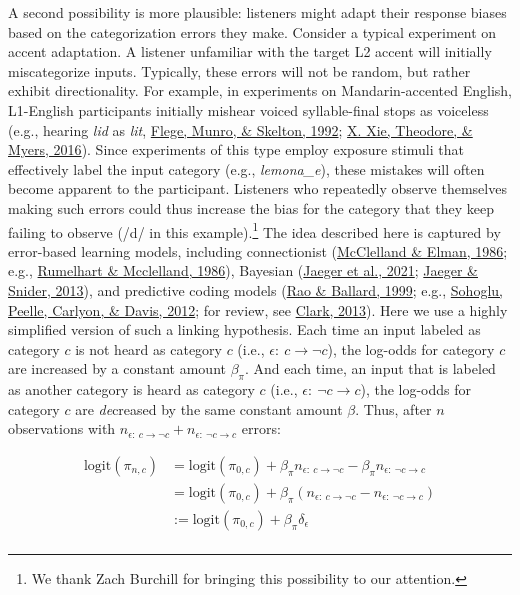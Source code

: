 \documentclass[
  11pt,
  english,
  man,floatsintext]{apa6}
\begin{document}
A second possibility is more plausible: listeners might adapt their response biases based on the categorization errors they make. Consider a typical experiment on accent adaptation. A listener unfamiliar with the target L2 accent will initially miscategorize inputs. Typically, these errors will not be random, but rather exhibit directionality. For example, in experiments on Mandarin-accented English, L1-English participants initially mishear voiced syllable-final stops as voiceless (e.g., hearing \emph{lid} as \emph{lit}, \protect\hyperlink{ref-flege1992}{Flege, Munro, \& Skelton, 1992}; \protect\hyperlink{ref-xie2016jep}{X. Xie, Theodore, \& Myers, 2016}). Since experiments of this type employ exposure stimuli that effectively label the input category (e.g., \emph{lemona\_e}), these mistakes will often become apparent to the participant. Listeners who repeatedly observe themselves making such errors could thus increase the bias for the category that they keep failing to observe (/d/ in this example).\footnote{We thank Zach Burchill for bringing this possibility to our attention.} The idea described here is captured by error-based learning models, including connectionist (\protect\hyperlink{ref-mcclelland-elman1986}{McClelland \& Elman, 1986}; e.g., \protect\hyperlink{ref-rumelhart-mcclelland1986}{Rumelhart \& Mcclelland, 1986}), Bayesian (\protect\hyperlink{ref-jaeger2019}{Jaeger et al., 2021}; \protect\hyperlink{ref-jaeger-snider2013}{Jaeger \& Snider, 2013}), and predictive coding models (\protect\hyperlink{ref-rao-ballard1999}{Rao \& Ballard, 1999}; e.g., \protect\hyperlink{ref-sohoglu2012}{Sohoglu, Peelle, Carlyon, \& Davis, 2012}; for review, see \protect\hyperlink{ref-clark2013}{Clark, 2013}). Here we use a highly simplified version of such a linking hypothesis. Each time an input labeled as category \(c\) is not heard as category \(c\) (i.e., \(\epsilon\mathrm{:}\ c \rightarrow \neg c\)), the log-odds for category \(c\) are increased by a constant amount \(\beta_{\pi}\). And each time, an input that is labeled as another category is heard as category \(c\) (i.e., \(\epsilon\mathrm{:}\ \neg c \rightarrow c\)), the log-odds for category \(c\) are \emph{de}creased by the same constant amount \(\beta\). Thus, after \(n\) observations with \(n_{\epsilon\mathrm{:}\ c \rightarrow \neg c} + n_{\epsilon\mathrm{:}\ \neg c \rightarrow c}\) errors:

\begin{equation}\label{eq:bias-updating}
\begin{split}
\mathrm{logit}(\pi_{n,c}) & = \mathrm{logit}(\pi_{0,c}) + \beta_{\pi} n_{\epsilon\mathrm{:}\ c \rightarrow \neg c} - \beta_{\pi} n_{\epsilon\mathrm{:}\ \neg c \rightarrow c} \\
                          & = \mathrm{logit}(\pi_{0,c}) + \beta_{\pi} (n_{\epsilon\mathrm{:}\ c \rightarrow \neg c} - n_{\epsilon\mathrm{:}\ \neg c \rightarrow c}) \\
                          & := \mathrm{logit}(\pi_{0,c}) + \beta_{\pi} \delta_{\epsilon} \\
\end{split}
\end{equation}
\end{document}

